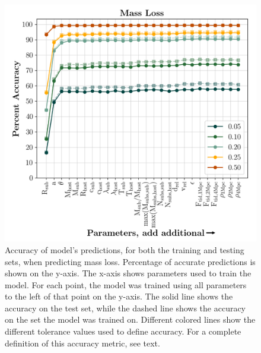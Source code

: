 \documentclass[fleqn,usenatbib]{mnras}
\begin{document}
\begin{figure}
	\includegraphics[width=\columnwidth]{Figures/massloss_predictions}
    \caption{Accuracy of model's predictions, for both the training and testing sets, when predicting mass loss. Percentage of accurate predictions is shown on the y-axis. The x-axis shows parameters used to train the model. For each point, the model was trained using all parameters to the left of that point on the y-axis. The solid line shows the accuracy on the test set, while the dashed line shows the accuracy on the set the model was trained on. Different colored lines show the different tolerance values used to define accuracy. For a complete definition of this accuracy metric, see text.}
    \label{fig:massloss_predictions}
\end{figure}
\end{document}
